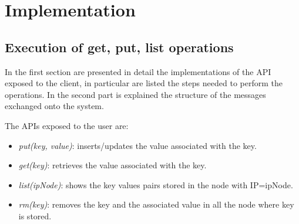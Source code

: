 \chapter{Implementation}
\section{Execution of get, put, list operations}
In the first section are presented in detail the implementations of the API exposed to the client, in particular are listed the steps needed to perform the operations.  In the second part  is explained the structure of the messages exchanged onto the system.

The APIs exposed to the user are:
\begin{itemize}
	\item \emph{put(key, value)}: inserts/updates the value associated with the key.
	\item \emph{get(key)}: retrieves the value associated with the key.
	\item \emph{list(ipNode)}: shows the key values pairs stored in the node with IP=ipNode.
	\item \emph{rm(key)}: removes the key and the associated value in all the node where key is stored.
\end{itemize}

